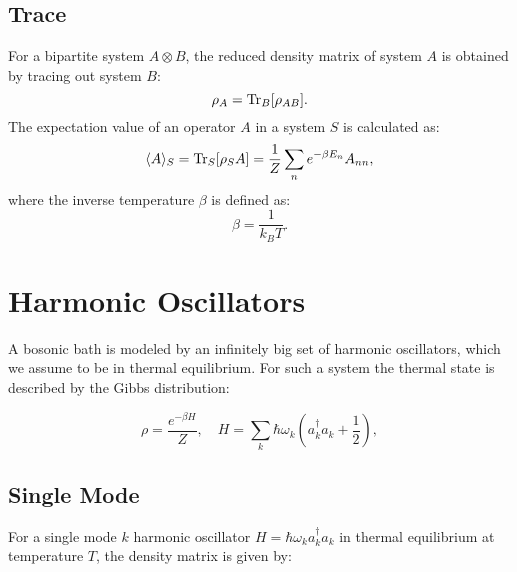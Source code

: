 
\subsection{Trace}
For a bipartite system \( A \otimes B \), the reduced density matrix of system \( A \) is obtained by tracing out system \( B \):
\begin{equation} \label{eq:partial_trace}
	\rho_A = \mathrm{Tr}_B[\rho_{AB}].
\end{equation}
The expectation value of an operator \( A \) in a system \( S \) is calculated as:
\begin{equation} \label{eq:expectation_value}
	\langle A \rangle_S = \mathrm{Tr}_S[\rho_S A] = \frac{1}{Z} \sum_n e^{-\beta E_n} A_{nn},
\end{equation}
where the inverse temperature \(\beta\) is defined as:
\begin{equation} \label{eq:beta_definition}
	\beta = \frac{1}{k_B T}.
\end{equation}



\section{Harmonic Oscillators}
A bosonic bath is modeled by an infinitely big set of harmonic oscillators, which we assume to be in thermal equilibrium.
For such a system the thermal state is described by the Gibbs distribution:

\begin{equation} \label{eq:gibbs_state}
	\rho = \frac{e^{-\beta H}}{Z}, \quad H = \sum_k \hbar \omega_k \left(a_k^{\dagger} a_k + \frac{1}{2}\right),
\end{equation}

\subsection{Single Mode}
For a single mode \( k \) harmonic oscillator \( H = \hbar \omega_k a_k^{\dagger} a_k \) in thermal equilibrium at temperature \( T \), the density matrix is given by:

